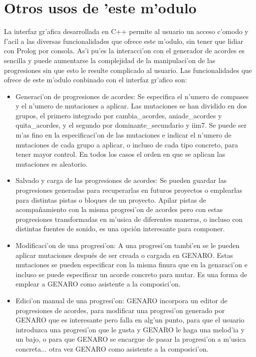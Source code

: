 \section {Otros usos de 'este m'odulo}
La interfaz gr'afica desarrollada en C++ permite al usuario un acceso c'omodo y f'acil a las diversas funcionalidades que ofrece este m'odulo, sin tener que lidiar con Prolog por consola. As'i pu'es la interacci'on con el generador de acordes es sencilla y puede aumentarse la complejidad de la manipulaci'on de las progresiones sin que esto le resulte complicado al usuario. Las funcionalidades que ofrece de este m'odulo conbinado con el interfaz gr'afico son:
\begin{itemize}
\item Generaci'on de progresiones de acordes: Se especifica el n'umero de compases y el n'umero de mutaciones a aplicar.  Las mutaciones se han dividido en dos grupos, el primero integrado por cambia\_acordes, aniade\_acordes y quita\_acordes, y el segundo por dominante\_secundario y iim7. Se puede ser m'as fino en la especificaci'on de las mutaciones e indicar el n'umero de mutaciones de cada grupo a aplicar, o incluso de cada tipo concreto, para tener mayor control. En todos los casos el orden en que se aplican las mutaciones es aleatorio.
\item Salvado y carga de las progresiones de acordes: Se pueden guardar las progresiones generadas para recuperarlas en futuros proyectos o emplearlas para distintas pistas o bloques de un proyecto. Apilar pistas de acompa\~namiento con la misma progresi'on de acordes pero con estas progresiones transformadas en m'usica de diferentes maneras, o incluso con distintas fuentes de sonido, es una opci\'on interesante para componer.
\item Modificaci'on de una progresi'on: A una progresi'on tambi'en se le pueden aplicar mutaciones despu\'es de ser creada o cargada en GENARO. Estas mutaciones se pueden especificar con la misma finura que en la genaraci'on e incluso se puede especificar un acorde concreto para mutar. Es una forma de emplear a GENARO como asistente a la composici'on.
\item Edici'on manual de una progresi'on: GENARO incorpora un editor de progresiones de acordes, para modificar una progresi'on generado por GENARO que es interesante pero falla en alg'un punto, para que el usuario introduzca una progresi'on que le gusta y GENARO le haga una melod'ia y un bajo, o para que GENARO se encargue de pasar la progresi'on a m'usica concreta... otra vez GENARO como asistente a la composici'on.
\end{itemize}

